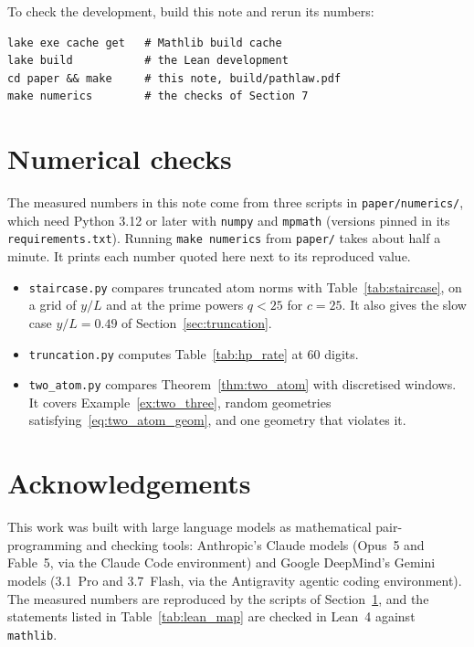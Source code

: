 \documentclass[11pt,a4paper]{article}
\theoremstyle{plain}
\theoremstyle{definition}
\theoremstyle{remark}
\begin{document}
To check the development, build this note and rerun its numbers:
\begin{verbatim}
lake exe cache get   # Mathlib build cache
lake build           # the Lean development
cd paper && make     # this note, build/pathlaw.pdf
make numerics        # the checks of Section 7
\end{verbatim}

\section{Numerical checks}\label{sec:numerics}

The measured numbers in this note come from three scripts in \texttt{paper/numerics/}, which need Python 3.12 or later with \texttt{numpy} and \texttt{mpmath} (versions pinned in its \texttt{requirements.txt}). Running \texttt{make numerics} from \texttt{paper/} takes about half a minute. It prints each number quoted here next to its reproduced value.
\begin{itemize}[leftmargin=1.8em]
  \item \texttt{staircase.py} compares truncated atom norms with Table~\ref{tab:staircase}, on a grid of $y/L$ and at the prime powers $q < 25$ for $c = 25$. It also gives the slow case $y/L = 0.49$ of Section~\ref{sec:truncation}.
  \item \texttt{truncation.py} computes Table~\ref{tab:hp_rate} at $60$ digits.
  \item \texttt{two\_atom.py} compares Theorem~\ref{thm:two_atom} with discretised windows. It covers Example~\ref{ex:two_three}, random geometries satisfying~\eqref{eq:two_atom_geom}, and one geometry that violates it.
\end{itemize}

\section*{Acknowledgements}
This work was built with large language models as mathematical pair-programming and checking tools: Anthropic's Claude models (Opus~5 and Fable~5, via the Claude Code environment) and Google DeepMind's Gemini models (3.1~Pro and 3.7~Flash, via the Antigravity agentic coding environment). The measured numbers are reproduced by the scripts of Section~\ref{sec:numerics}, and the statements listed in Table~\ref{tab:lean_map} are checked in Lean~4 against \texttt{mathlib}.
\end{document}
